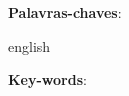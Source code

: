 \begin{epigrafe}
    \vspace*{\fill}
	\begin{flushright}
        \EpigrafeTexto
	\end{flushright}
\end{epigrafe}


\setlength{\absparsep}{18pt} %
\begin{resumo}
    \ResumoTexto
    \vspace{\onelineskip}
    \noindent 
    \textbf{Palavras-chaves}: \PalavraschaveTexto
\end{resumo}

\begin{resumo}[ABSTRACT]
 \begin{otherlanguage*}{english}
   \AbstractTexto
   \vspace{\onelineskip}
 
   \noindent 
   \textbf{Key-words}: \KeywordsTexto
 \end{otherlanguage*}
\end{resumo}

%  
% 
%   

\listoffigures*
\cleardoublepage

\listoftables*

\imprimirlistadesiglas

\imprimirlistadesimbolos

\tableofcontents*
\cleardoublepage
